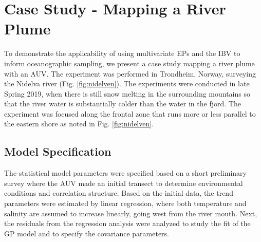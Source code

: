\documentclass[aoas]{imsart}
\begin{document}

\section{Case Study - Mapping a River Plume}
\label{sec:case_study}

To demonstrate the applicability of using multivariate EPs and the IBV
to inform oceanographic sampling, we present a case study mapping a
river plume with an AUV. The experiment was performed in Trondheim,
Norway, surveying the Nidelva river (Fig. \ref{fig:nidelven}). The
experiments were conducted in late Spring 2019, when there is still
snow melting in the surrounding mountains so that the river water is
substantially colder than the water in the fjord. The experiment was
focused along the frontal zone that runs more or less parallel to the
eastern shore as noted in Fig. \ref{fig:nidelven}.

\subsection{Model Specification}
\label{sec:exp_modeling}
The statistical model parameters were specified based on a short
preliminary survey where the AUV made an initial transect to determine
environmental conditions and correlation structure. Based on the
initial data, the trend parameters were estimated by linear
regression, where both temperature and salinity are assumed to
increase linearly, going west from the river mouth. Next, the
residuals from the regression analysis were analyzed to study the fit
of the GP model and to specify the covariance parameters.

\end{document}
